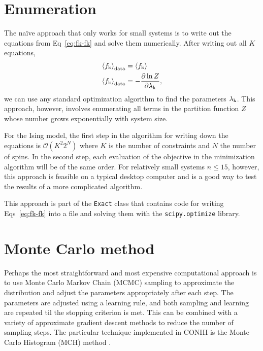 \documentclass[aps,prl,twocolumn,nofootinbib]{revtex4-1}
\begin{document}
\section{Enumeration}
The na\"{i}ve approach that only works for small systems is to write out the equations from Eq~\ref{eq:fk-fk} and solve them numerically. After writing out all $K$ equations,
\begin{align}
	\left<f_{\rm k}\right>_{\rm data} &= \left<f_{\rm k}\right>\\
	\left<f_{\rm k}\right>_{\rm data} &= -\frac{\partial \ln Z}{\partial \lambda_{\rm k}},
\end{align}
we can use any standard optimization algorithm to find the parameters $\lambda_{\rm k}$. 
This approach, however, involves enumerating all terms in the partition function $Z$ whose number grows exponentially with system size. 

For the Ising model, the first step in the algorithm for writing down the equations is $\mathcal{O}(K^2 2^{N})$ where $K$ is the number of constraints and $N$ the number of spins. In the second step, each evaluation of the objective in the minimization algorithm will be of the same order. For relatively small systems $n\leq15$, however, this approach is feasible on a typical desktop computer and is a good way to test the results of a more complicated algorithm.

This approach is part of the {\tt Exact} class that contains code for writing Eqs~\ref{eq:fk-fk} into a file and solving them with the {\tt scipy.optimize} library.


\section{Monte Carlo method}
Perhaps the most straightforward and most expensive computational approach is to use Monte Carlo Markov Chain (MCMC) sampling to approximate the distribution and adjust the parameters appropriately after each step. The parameters are adjusted using a learning rule, and both sampling and learning are repeated til the stopping criterion is met.
This can be combined with a variety of approximate gradient descent methods to reduce the number of sampling steps. The particular technique implemented in CONIII is the Monte Carlo Histogram (MCH) method \cite{Broderick:2007wq}.
\end{document}
